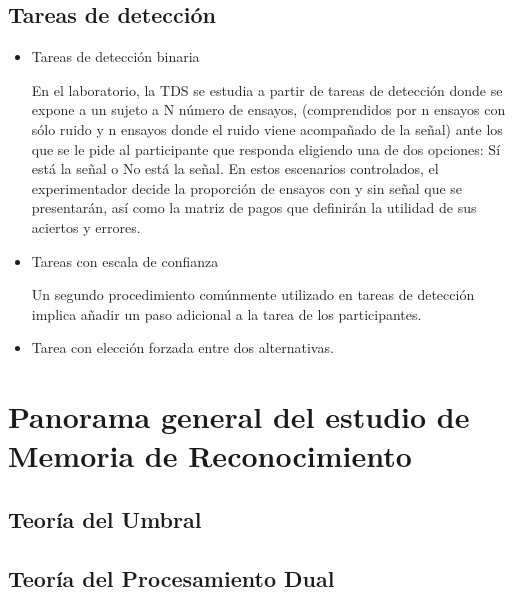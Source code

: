 \subsection{Tareas de detección}

\begin{itemize}
\item Tareas de detección binaria 

En el laboratorio, la  TDS se estudia a partir  de tareas de detección donde se expone a un  sujeto  a  N  número  de  ensayos,  (comprendidos  por  n  ensayos con  sólo  ruido  y  n  ensayos donde  el  ruido  viene  acompañado  de  la  señal)  ante  los  que  se  le  pide  al  participante  que responda eligiendo una de dos opciones: Sí está la señal o No está la señal. En estos escenarios controlados,  el  experimentador  decide  la  proporción  de  ensayos  con  y  sin  señal  que  se presentarán, así como la matriz de pagos que definirán la utilidad de sus aciertos y errores. \\


\item Tareas con escala de confianza

Un segundo procedimiento comúnmente utilizado en tareas de detección implica añadir un paso adicional a la tarea de los participantes. 

\parencite{McNicol}

\item Tarea con elección forzada entre dos alternativas.



\end{itemize}














\section{Panorama general del estudio de Memoria de Reconocimiento}

\subsection{Teoría del Umbral}

\subsection{Teoría del Procesamiento Dual}

